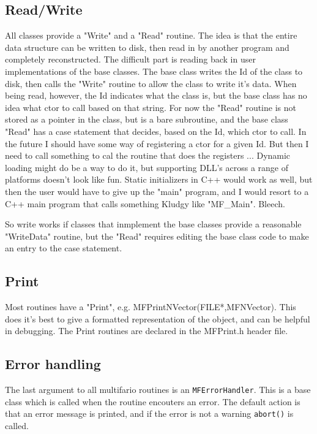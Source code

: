 \documentclass[12pt]{article}
\begin{document}
\subsection{Read/Write}

All classes provide a "Write" and a "Read" routine. The idea is that the entire data structure
can be written to disk, then read in by another program and completely reconstructed. The difficult
part is reading back in user implementations of the base classes. The base class writes the Id of
the class to disk, then calls the "Write" routine to allow the class to write it's data. When 
being read, however, the Id indicates what the class is, but the base class has no idea what
ctor to call based on that string. For now the "Read" routine is not stored as a pointer in the class,
but is a bare subroutine, and the base class "Read" has a case statement that decides, based on the
Id, which ctor to call. In the future I should have some way of registering a ctor for a given Id. But
then I need to call something to cal the routine that does the registers ... Dynamic loading might
do be a way to do it, but supporting DLL's across a range of platforms doesn't look like fun. Static
initializers in C++ would work as well, but then the user would have to give up the "main" program,
and I would resort to a C++ main program that calls something Kludgy like "MF\_Main". Bleech.

So write works if classes that inmplement the base classes provide a reasonable "WriteData" routine,
but the "Read" requires editing the base class code to make an entry to the case statement.

\subsection{Print}

Most routines have a "Print", e.g. MFPrintNVector(FILE*,MFNVector). This does it's best to give a 
formatted representation of the object, and can be helpful in debugging. The Print routines are declared in the MFPrint.h
header file.

\subsection{Error handling}

The last argument to all multifario routines is an {\tt MFErrorHandler}. This is a base class which is called when the
routine encouters an error. The default action is that an error message is printed, and if the error is not a warning
{\tt abort()} is called.
\end{document}
